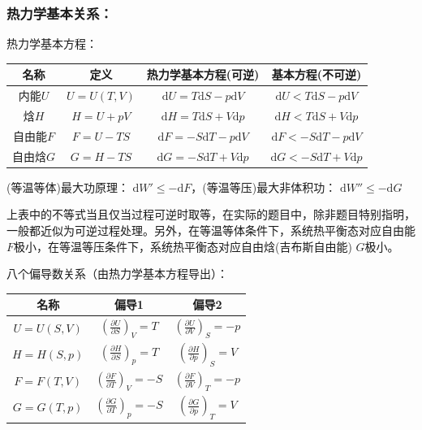 \documentclass[zihao=-4,UTF8]{report}
\begin{document}
\subsubsection{热力学基本关系：}
热力学基本方程：
\begin{table}[H]
    \centering
    \begin{tabular}{cccc} 
    \toprule
    名称 & 定义 & 热力学基本方程(可逆) & 基本方程(不可逆)  \\
    \midrule
    内能$U$ & $U = U(T,V)$ & $\mathrm{d}U = T\mathrm{d}S -p\mathrm{d}V $ &  $\mathrm{d}U < T\mathrm{d}S -p\mathrm{d}V $ \\
    焓$H$ & $H = U+pV$ & $\mathrm{d}H = T\mathrm{d}S  + V\mathrm{d}p$ &$\mathrm{d}H < T\mathrm{d}S  + V\mathrm{d}p$\\
    自由能$F$ & $F = U-TS$ & $\mathrm{d}F = -S\mathrm{d}T-p\mathrm{d}V$ & $\mathrm{d}F < -S\mathrm{d}T-p\mathrm{d}V$  \\
    自由焓$G$ & $G = H - TS$ & $\mathrm{d}G = -S\mathrm{d}T + V\mathrm{d}p$ & $\mathrm{d}G < -S\mathrm{d}T + V\mathrm{d}p$  \\
    \bottomrule
    \end{tabular}
\end{table}
(等温等体)最大功原理： $\mathrm{d}W' \le -\mathrm{d}F$，(等温等压)最大非体积功： $\mathrm{d}W'' \le -\mathrm{d}G$

{\par\color{gray}\small
上表中的不等式当且仅当过程可逆时取等，在实际的题目中，除非题目特别指明，一般都近似为可逆过程处理。另外，{\color{red}在等温等体条件下，系统热平衡态对应自由能$F$极小，在等温等压条件下，系统热平衡态对应自由焓(吉布斯自由能) $G$极小。}
\par}
八个偏导数关系（由热力学基本方程导出）：
\begin{table}[H]
    \centering
    \begin{tabular}{ccc} 
    \toprule
    名称 & 偏导1 & 偏导2  \\
    \midrule
    $U = U(S,V)$ & $\left(\frac{\partial U}{\partial S}\right)_V = T$ & $\left(\frac{\partial U}{\partial V}\right)_S =-p $ \\
    $H = H(S,p)$ & $\left(\frac{\partial H}{\partial S}\right)_p = T$ & $\left(\frac{\partial H}{\partial p}\right)_S = V $ \\
    $F = F(T,V)$ & $\left(\frac{\partial F}{\partial T}\right)_V = -S$ & $\left(\frac{\partial F}{\partial V}\right)_T = -p$ \\
    $G = G(T,p)$ & $\left(\frac{\partial G}{\partial T}\right)_p = -S$ & $\left(\frac{\partial G}{\partial p }\right)_T = V$ \\
    \bottomrule
    \end{tabular}
\end{table}
\end{document}
